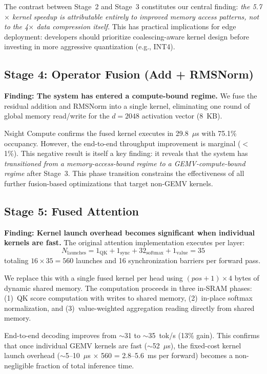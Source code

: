 \documentclass[conference]{IEEEtran}
\begin{document}
The contrast between Stage~2 and Stage~3 constitutes our central finding: \emph{the 5.7$\times$ kernel speedup is attributable entirely to improved memory access patterns, not to the 4$\times$ data compression itself}. This has practical implications for edge deployment: developers should prioritize coalescing-aware kernel design before investing in more aggressive quantization (e.g., INT4).

\subsection{Stage 4: Operator Fusion (Add + RMSNorm)}

\textbf{Finding: The system has entered a compute-bound regime.} We fuse the residual addition and RMSNorm into a single kernel, eliminating one round of global memory read/write for the $d=2048$ activation vector (8~KB).

Nsight Compute confirms the fused kernel executes in 29.8~$\mu$s with 75.1\% occupancy. However, the end-to-end throughput improvement is marginal ($<$1\%). This negative result is itself a key finding: it reveals that the system has \emph{transitioned from a memory-access-bound regime to a GEMV-compute-bound regime} after Stage~3. This phase transition constrains the effectiveness of all further fusion-based optimizations that target non-GEMV kernels.

\subsection{Stage 5: Fused Attention}

\textbf{Finding: Kernel launch overhead becomes significant when individual kernels are fast.} The original attention implementation executes per layer:
\begin{equation}
    N_{\text{launches}} = 1_{\text{QK}} + 1_{\text{sync}} + 32_{\text{softmax}} + 1_{\text{value}} = 35
\end{equation}
totaling $16 \times 35 = 560$ launches and 16 synchronization barriers per forward pass.

We replace this with a single fused kernel per head using $(pos+1) \times 4$ bytes of dynamic shared memory. The computation proceeds in three in-SRAM phases: (1)~QK score computation with writes to shared memory, (2)~in-place softmax normalization, and (3)~value-weighted aggregation reading directly from shared memory.

End-to-end decoding improves from $\sim$31 to $\sim$35~tok/s (13\% gain). This confirms that once individual GEMV kernels are fast ($\sim$52~$\mu$s), the fixed-cost kernel launch overhead ($\sim$5--10~$\mu$s $\times$ 560 = 2.8--5.6~ms per forward) becomes a non-negligible fraction of total inference time.
\end{document}
